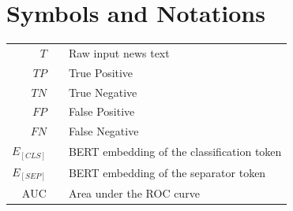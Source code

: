 \sloppy
\pagestyle{fancy}
\chapter*{\centering Symbols and Notations}

\begin{longtable}{r p{0.5in} p{4.0in}}
$T$  &   & Raw input news text \\
$TP$ &   & True Positive \\
$TN$ &   & True Negative \\
$FP$ &   & False Positive \\
$FN$ &   & False Negative \\
$E_{[CLS]}$ &   & BERT embedding of the classification token \\
$E_{[SEP]}$ &   & BERT embedding of the separator token \\
$\text{AUC}$ &   & Area under the ROC curve \\
\end{longtable}
